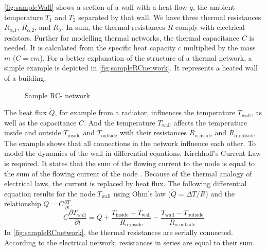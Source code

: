     \autoref{fig:sampleWall} shows a section of a wall with a heat flow $\dot{q}$, the ambient temperature $T_\text{1}$ and $T_\text{2}$ separated by that wall. We have three thermal resistances $R_{\alpha\text{,1}}$, $R_{\alpha\text{,2}}$, and $R_\lambda$.   
    In sum, the thermal resistances $R$ comply with electrical resistors.
    Further for modelling thermal networks, the thermal capacitance $C$ is needed. It is calculated from the specific heat capacity $c$ multiplied by the mass $m$ ($C=cm$).
    \newline
    For a better explanation of the structure of a thermal network, a simple example is depicted in \autoref{fig:sampleRCnetwork}. It represents a heated wall of a building.
    \begin{figure}[h]
    \centering
    \def\svgwidth{300pt}
    
    \caption{Sample RC- network}
    \label{fig:sampleRCnetwork}
    \end{figure}
    The heat flux $\dot{Q}$, for example from a radiator, influences the temperature $T_\text{wall}$, as well as the capacitance $C$. And the temperature $T_\text{wall}$ affects the temperature inside and outside $T_\text{inside}$ and $T_\text{outside}$ with their resistances $R_{\alpha \text{,inside}}$ and $R_{\alpha \text{,outside}}$. The example shows that all connections in the network influence each other.
    To model the dynamics of the wall in differential equations, Kirchhoff's Current Law is required. It states that the sum of the flowing current to the node is equal to the sum of the flowing current of the node 
    \cite{Kuchling.2007}. 
    Because of the thermal analogy of electrical laws, the current is replaced by heat flux. The following differential equation results for the node  $T_\text{wall}$ using Ohm's law ($\dot{Q}=\Delta T/R$) and the relationship $\dot{Q}=C\frac{\partial T}{\partial t}$.     
    \begin{equation}
    \label{eq:sampledifferential}
    C \frac{\partial T_\text{wall}}{\partial t} = \dot{Q} + \frac{T_\text{inside}-T_\text{wall}}{R_{\alpha \text{,inside}}} - \frac{T_\text{wall}-T_\text{outside}}{R_{\alpha\text{,outside}}}
    \end{equation}
    In \autoref{fig:sampleRCnetwork}, the thermal resistances are serially connected. According to the electrical network, resistances in series are equal to their sum. 
